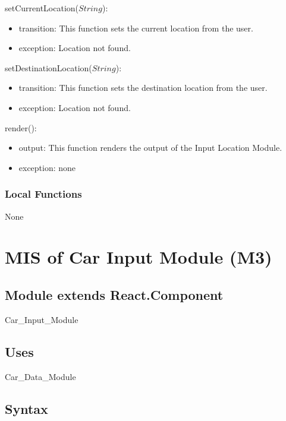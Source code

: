 \documentclass[12pt, titlepage]{article}
\begin{document}
\noindent setCurrentLocation($String$):
\begin{itemize}
\item transition: This function sets the current location from the user.
\item exception: Location not found.
\end{itemize}

\noindent setDestinationLocation($String$):
\begin{itemize}
\item transition: This function sets the destination location from the user.
\item exception: Location not found.
\end{itemize}

\noindent render():
\begin{itemize}
\item output: This function renders the output of the Input Location Module.
\item exception: none
\end{itemize}

\subsubsection{Local Functions}

None

\newpage




\section{MIS of Car Input Module (M3)} 

\label{Module} 

\subsection{Module extends React.Component}

Car\_Input\_Module

\subsection{Uses}

Car\_Data\_Module

\subsection{Syntax}
\end{document}
